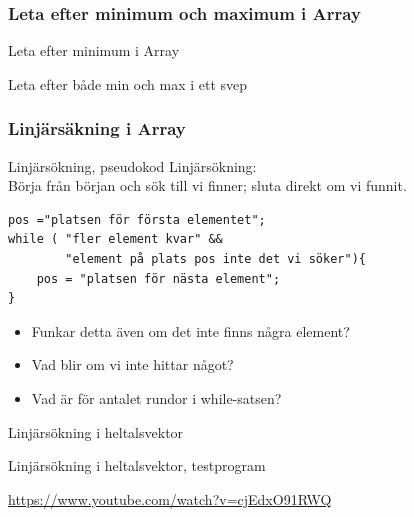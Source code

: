 \documentclass{lecturenotes}
\begin{document}
\subsubsection{Leta efter minimum och maximum i Array}
\begin{Slide}{Leta efter minimum i Array}

\end{Slide}

\begin{Slide}{Leta efter både min och max i ett svep}

\end{Slide}

\subsubsection{Linjärsäkning i Array}
\begin{Slide}{Linjärsökning, pseudokod}
Linjärsökning: \\Börja från början och sök till vi finner; sluta direkt om vi funnit.
\begin{lstlisting}[basicstyle=\ttfamily\fontsize{10}{13}\selectfont]
pos ="platsen för första elementet";
while ( "fler element kvar" && 
        "element på plats pos inte det vi söker"){
    pos = "platsen för nästa element";
}
\end{lstlisting}
\begin{itemize} 
\item Funkar detta även om det inte finns några element?
\item Vad blir   om vi inte hittar något?
\item Vad är  för antalet rundor i while-satsen? 
\end{itemize}  
\end{Slide}

\begin{Slide}{Linjärsökning i heltalsvektor}

\end{Slide}

\begin{Slide}{Linjärsökning i heltalsvektor, testprogram}

\url{https://www.youtube.com/watch?v=cjEdxO91RWQ}
\end{Slide}
\end{document}
